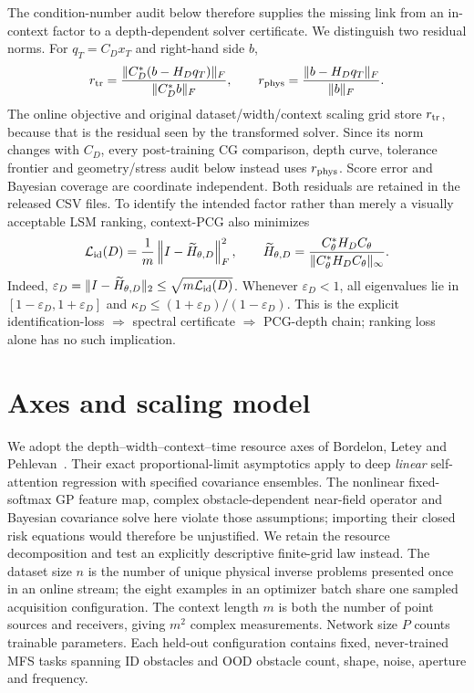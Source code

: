\documentclass[10pt]{article}
\begin{document}
The condition-number audit below therefore supplies the missing link from an
in-context factor to a depth-dependent solver certificate.
We distinguish two residual norms.  For $q_T=C_Dx_T$ and right-hand side $b$,
\[
 r_{\rm tr}=
 \frac{\|C_D^*(b-H_Dq_T)\|_F}{\|C_D^*b\|_F},\qquad
 r_{\rm phys}=
 \frac{\|b-H_Dq_T\|_F}{\|b\|_F}.
\]
The online objective and original dataset/width/context scaling grid store
$r_{\rm tr}$, because that is the residual seen by the transformed solver.
Since its norm changes with $C_D$, every post-training CG comparison, depth
curve, tolerance frontier and geometry/stress audit below instead uses
$r_{\rm phys}$.  Score error and Bayesian coverage are coordinate
independent.  Both residuals are retained in the released CSV files.
To identify the intended factor rather than merely a visually acceptable LSM
ranking, context-PCG also minimizes
\[
 \mathcal L_{\rm id}(D)=\frac1m
 \left\|I-\widetilde H_{\theta,D}\right\|_F^2,
 \qquad
 \widetilde H_{\theta,D}=
 \frac{C_\theta^*H_DC_\theta}
 {\|C_\theta^*H_DC_\theta\|_\infty}.
\]
Indeed, $\varepsilon_D=\|I-\widetilde H_{\theta,D}\|_2
\leq\sqrt{m\mathcal L_{\rm id}(D)}$.  Whenever
$\varepsilon_D<1$, all eigenvalues lie in
$[1-\varepsilon_D,1+\varepsilon_D]$ and
$\kappa_D\leq(1+\varepsilon_D)/(1-\varepsilon_D)$.  This is the explicit
identification-loss $\Rightarrow$ spectral certificate $\Rightarrow$ PCG-depth
chain; ranking loss alone has no such implication.

\section{Axes and scaling model}
We adopt the depth--width--context--time resource axes of
Bordelon, Letey and Pehlevan~\cite{bordelon2025}.  Their exact
proportional-limit asymptotics apply to deep \emph{linear} self-attention regression with
specified covariance ensembles.  The nonlinear fixed-softmax GP feature map,
complex obstacle-dependent near-field operator and Bayesian covariance solve
here violate those assumptions; importing their closed risk equations would
therefore be unjustified.  We retain the resource decomposition and test an
explicitly descriptive finite-grid law instead.
The dataset size $n$ is the number of unique physical inverse problems
presented once in an online stream; the eight examples in an optimizer batch
share one sampled acquisition configuration.  The context length $m$ is both
the number of point sources and receivers, giving $m^2$ complex measurements.
Network size $P$ counts trainable parameters.  Each held-out configuration
contains fixed, never-trained MFS tasks spanning ID obstacles and OOD obstacle
count, shape, noise, aperture and frequency.
\end{document}

